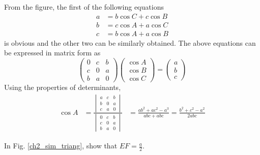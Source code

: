 \proof From the figure, the first of the following equations
%
\begin{align}
a &= b \cos C + c \cos B \\
b &= c \cos A + a \cos C \\
c &= b \cos A + a \cos B
\end{align}
%
is obvious and the other two can be similarly obtained.  The above equations can be expressed in matrix form as
%
\begin{equation}
\begin{pmatrix}
0 & c & b \\
c & 0 & a \\
b & a & 0
\end{pmatrix}
\begin{pmatrix}
\cos A \\
\cos B \\
\cos C
\end{pmatrix}
= 
\begin{pmatrix}
a\\
b\\
c
\end{pmatrix}
\end{equation}
%
Using the properties of determinants,
%
\begin{align}
\cos A &= \frac{
\begin{vmatrix}
a & c & b \\
b & 0 & a \\
c & a & 0
\end{vmatrix}
	}
	{
\begin{vmatrix}
0 & c & b \\
c & 0 & a \\
b & a & 0
\end{vmatrix}
	}
	&=\frac{ab^2 + ac^2 - a^3}{abc + abc} = \frac{b^2 + c^2 - a^2}{2abc}
\end{align}
%
%
\begin{problem}
	In Fig. \ref{ch2_sim_triang}, show that $EF = \frac{a}{2}$.  
\end{problem}
%
